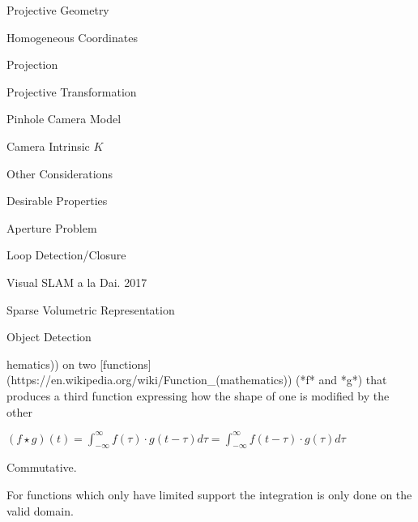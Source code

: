 \begin{section}
\begin{subsubsection}
\begin{subsubsection}
\begin{subsubsection}
\begin{section}{Projective Geometry}
\begin{subsection}{Homogeneous Coordinates}
\begin{subsubsection}
{\begin{subsubsection}{Projection}
\begin{subsubsection}{Projective Transformation}
\begin{subsection}
\begin{subsubsection}
\begin{subsubsection}
\begin{subsubsection}
{\begin{subsubsection}
\begin{subsection}
\begin{subsection} {Pinhole Camera Model}
\begin{subsection} {Camera Intrinsic $K$}
\begin{subsection}
\begin{subsection}
\begin{subsubsection}{Other Considerations}
{\begin{subsection}
\begin{subsubsection}{Desirable Properties}
\begin{section}
\begin{subsection}
\begin{subsection}
\begin{subsection}
\begin{section}
\begin{subsection}
\begin{subsubsection}
\begin{subsubsection}
\begin{subsection}
\begin{section}
\begin{subsection}
\begin{subsubsection}{Aperture Problem}
\begin{subsubsection}
{\begin{section}
\begin{subsubsection}
\begin{subsubsection}
\begin{subsubsection}
\begin{subsection}
\begin{subsection}
\begin{subsection}
\begin{subsection}
\begin{subsection}
\begin{subsection}
\begin{subsection}
\begin{subsubsection}
{\begin{subsubsection}
{\begin{subsubsection}
\begin{section}
\begin{section}
\begin{section}
\begin{subsubsection}
\begin{subsubsection}{Loop Detection/Closure}
\begin{subsubsection}{Visual SLAM a la Dai. 2017}
\begin{subsubsection}{Sparse Volumetric Representation}
\begin{subsection}
\begin{section}{Object Detection}
\begin{subsubsection}
{\begin{subsection}
\begin{subsection}
\begin{section}
\begin{section}
\begin{subsection}
\begin{subsubsection}
\begin{subsubsection}
\begin{subsection}
\begin{subsection}
\begin{subsubsection}
\begin{subsubsection}
\begin{subsubsection}
{\begin{subsection}
\begin{subsection}
\begin{subsection}
\begin{subsection}
\begin{section}
\begin{subsection}
\begin{subsubsection}
\begin{subsubsection}
\begin{subsubsection}
\begin{subsubsection}
\begin{subsubsection}
\begin{subsubsection}
\begin{subsection}
\begin{subsubsection}
\begin{subsection}
\begin{subsection}
\begin{subsubsection}
\begin{subsubsection}
\begin{subsection}
\begin{subsubsection}
{{\begin{section}
\begin{section}
\begin{subsection}
{{{\begin{subsubsection}
\begin{subsubsection}
hematics)) on two [functions](https://en.wikipedia.org/wiki/Function_(mathematics)) (*f* and *g*) that produces a third function expressing how the shape of one is modified by the other

$(f\star g)(t) = \int_{-\infty}^{\infty} f(\tau)\cdot g(t-\tau)d\tau = \int_{-\infty}^{\infty} f(t-\tau)\cdot g(\tau)d\tau $

Commutative. 

For functions which only have limited support the integration is only done on the valid domain.

\end{subsubsection}
\end{subsubsection}}}}
\end{subsection}
\end{section}
\end{section}}}
\end{subsubsection}
\end{subsection}
\end{subsubsection}
\end{subsubsection}
\end{subsection}
\end{subsection}
\end{subsubsection}
\end{subsection}
\end{subsubsection}
\end{subsubsection}
\end{subsubsection}
\end{subsubsection}
\end{subsubsection}
\end{subsubsection}
\end{subsection}
\end{section}
\end{subsection}
\end{subsection}
\end{subsection}
\end{subsection}}
\end{subsubsection}
\end{subsubsection}
\end{subsubsection}
\end{subsection}
\end{subsection}
\end{subsubsection}
\end{subsubsection}
\end{subsection}
\end{section}
\end{section}
\end{subsection}
\end{subsection}}
\end{subsubsection}
\end{section}
\end{subsection}
\end{subsubsection}
\end{subsubsection}
\end{subsubsection}
\end{subsubsection}
\end{section}
\end{section}
\end{section}
\end{subsubsection}}
\end{subsubsection}}
\end{subsubsection}
\end{subsection}
\end{subsection}
\end{subsection}
\end{subsection}
\end{subsection}
\end{subsection}
\end{subsection}
\end{subsubsection}
\end{subsubsection}
\end{subsubsection}
\end{section}}
\end{subsubsection}
\end{subsubsection}
\end{subsection}
\end{section}
\end{subsection}
\end{subsubsection}
\end{subsubsection}
\end{subsection}
\end{section}
\end{subsection}
\end{subsection}
\end{subsection}
\end{section}
\end{subsubsection}
\end{subsection}}
\end{subsubsection}
\end{subsection}
\end{subsection}
\end{subsection}
\end{subsection}
\end{subsection}
\end{subsubsection}}
\end{subsubsection}
\end{subsubsection}
\end{subsubsection}
\end{subsection}
\end{subsubsection}
\end{subsubsection}}
\end{subsubsection}
\end{subsection}
\end{section}
\end{subsubsection}
\end{subsubsection}
\end{subsubsection}
\end{section}
